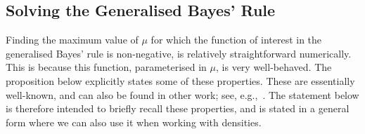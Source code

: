 \documentclass[twoside,11pt]{article}
\begin{document}

\subsection{Solving the Generalised Bayes' Rule}\label{sec:gbr}

Finding the maximum value of $\mu$ for which the function of interest in the generalised Bayes' rule is non-negative, is relatively straightforward numerically. This is because this function, parameterised in $\mu$, is very well-behaved. The proposition below explicitly states some of these properties. These are essentially well-known, and can also be found in other work; see, e.g.,~\cite[Section 2.7.3]{de2015credal}. The statement below is therefore intended to briefly recall these properties, and is stated in a general form where we can also use it when working with densities.
\end{document}
